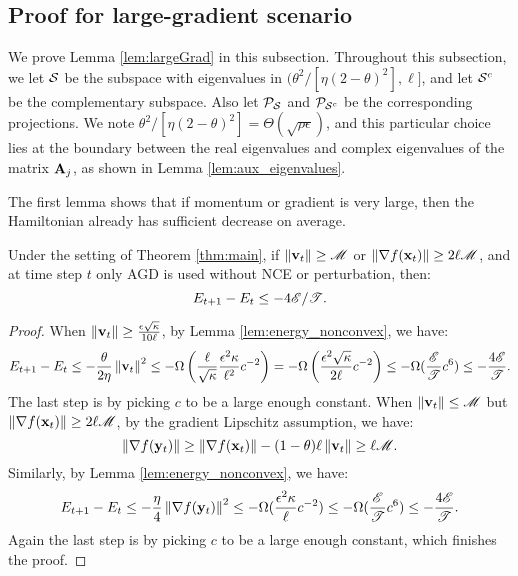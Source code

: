
\subsection{Proof for large-gradient scenario}
We prove Lemma \ref{lem:largeGrad} in this subsection. 
Throughout this subsection, we let $\S$ be the subspace with eigenvalues in $(\theta^2/[\eta(2-\theta)^2], \ell]$, and let $\S^c$ be the complementary subspace. Also let $\proj_{\S}$ and $\proj_{\S^c}$ be the corresponding projections.
We note $\theta^2/[\eta(2-\theta)^2] = \Theta(\sqrt{\rho\epsilon})$, and this particular choice lies at the boundary between the real eigenvalues and complex eigenvalues of the matrix $\A_j$, as shown in Lemma \ref{lem:aux_eigenvalues}.

The first lemma shows that if momentum or gradient is very large, then the Hamiltonian already has sufficient decrease on average.

\begin{lemma}\label{lem:largegrad_momentum}
Under the setting of Theorem \ref{thm:main}, if $\norm{\v_t}\ge \umom$ or $\norm{\grad f(\x_t)} \ge 2\ell\umom$, and at time step $t$ only AGD is used without NCE or perturbation, then:
\begin{equation*}
 E_{t+1} - E_t \le - 4\ufun/\utime.
\end{equation*} 
\end{lemma}
\begin{proof}
When $\norm{\v_t} \ge \frac{\epsilon \sqrt{\cn}}{10\ell}$, by Lemma \ref{lem:energy_nonconvex}, we have:
\begin{align*}
E_{t+1} -E_t \le -\frac{\theta}{2\eta}\norm{\v_t}^2
\le -\Omega\left(\frac{\ell}{\sqrt{\cn}}\frac{\epsilon^2 \cn}{\ell^2}c^{-2}\right)
= -\Omega\left(\frac{\epsilon^2 \sqrt{\cn}}{2\ell}c^{-2}\right)
\le -\Omega(\frac{\ufun}{\utime} c^6) \le -\frac{4\ufun}{\utime}.
\end{align*}
The last step is by picking $c$ to be a large enough constant.
When $\norm{\v_t} \le \umom$ but $\norm{\grad f(\x_t)} \ge 2\ell\umom$, 
by the gradient Lipschitz assumption, we have:
\begin{equation*}
\norm{\grad f(\y_t)} \ge \norm{\grad f(\x_t)} - (1-\theta) \ell \norm{\v_t} \ge \ell \umom.
\end{equation*}
Similarly, by Lemma \ref{lem:energy_nonconvex}, we have:
\begin{align*}
E_{t+1} -E_t \le -\frac{\eta}{4}\norm{\grad f(\y_t)}^2 \le -\Omega(\frac{\epsilon^2 \cn}{\ell}c^{-2})
\le -\Omega(\frac{\ufun}{\utime} c^6) \le -\frac{4\ufun}{\utime}.
\end{align*}
Again the last step is by picking $c$ to be a large enough constant, which finishes the proof.
\end{proof}


